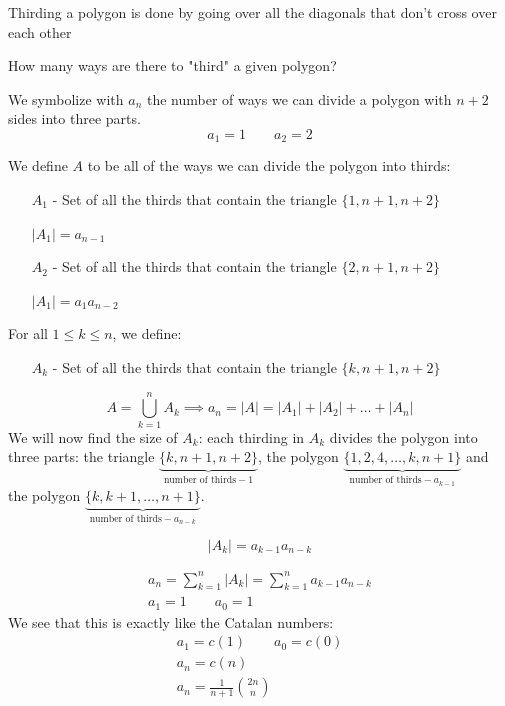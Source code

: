 \documentclass[00_complete]{subfiles}
\begin{document}
\begin{example}
Thirding a polygon is done by going over all the diagonals that don't
cross over each other

How many ways are there to "third" a given polygon?

We symbolize with $a_n$ the number of ways we can divide a polygon with
$n+2$ sides into three parts.
$$a_1=1 \qquad a_2=2$$

We define $A$ to be all of the ways we can divide the polygon into thirds:

\begin{itemize}
    \item[$A_1$ -] Set of all the thirds that contain the triangle
        $\{1,n+1,n+2\}$

    $|A_1|=a_{n-1}$
    \item[$A_2$ -] Set of all the thirds that contain the triangle
        $\{2,n+1,n+2\}$

    $|A_1|=a_{1}a_{n-2}$
\end{itemize}
For all $1 \leq k \leq n$, we define:
\begin{itemize}
    \item[$A_k$ -] Set of all the thirds that contain the triangle
        $\{k,n+1,n+2\}$
\end{itemize}
$$A=\bigcup_{k=1}^n A_k \implies a_n =|A|=|A_1|+|A_2|+\dots+|A_n|$$
We will now find the size of $A_k$: each thirding in $A_k$ divides the
polygon into three parts: the triangle
$\underbrace{\{k,n+1,n+2\}}_{\text{number of thirds}-1}$, the polygon
$\underbrace{\{1,2,4,\dots,k,n+1\}}_{\text{number of thirds}-a_{k-1}}$ and the
polygon $\underbrace{\{k,k+1,\dots,n+1\}}_{\text{number of thirds}-a_{n-k}}$.

$$|A_k|=a_{k-1}a_{n-k}$$
\begin{conclusion}
    \begin{gather*}
        a_n=\sum_{k=1}^{n}|A_k|=\sum_{k=1}^{n}a_{k-1}a_{n-k} \\
        a_1 = 1 \qquad a_0 = 1
    \end{gather*}
    We see that this is exactly like the Catalan numbers:
    \begin{gather*}
        a_1=c(1) \qquad a_0=c(0) \\
        a_n=c(n) \\
        \boxed{a_n=\frac{1}{n+1}\binom{2n}{n}}
    \end{gather*}
\end{conclusion}
\end{example}
\end{document}
